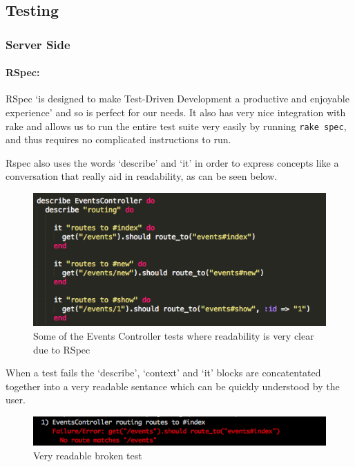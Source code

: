 \subsection{Testing}
  \subsubsection{Server Side}
    \paragraph{RSpec:}
      RSpec `is designed to make Test-Driven Development a productive and enjoyable experience'\cite{rspec-overview} and so is perfect for our needs. It also has very nice integration with rake and allows us to run the entire test suite very easily by running \verb!rake spec!, and thus requires no complicated instructions to run.

      Rspec also uses the words `describe' and `it' in order to express concepts like a conversation that really aid in readability, as can be seen below.

      \begin{figure}[H]\centering
      \includegraphics[scale=0.5]{images/project_management/testing/rspec_events_controller}
      \caption{Some of the Events Controller tests where readability is very clear due to RSpec}
      \end{figure}

      When a test fails the `describe', `context' and `it' blocks are concatentated together into a very readable sentance which can be quickly understood by the user. 
      
      \begin{figure}[H]\centering
      \includegraphics[scale=0.5]{images/project_management/testing/rspec_events_contoller_broken}
      \caption{Very readable broken test}
      \end{figure}

